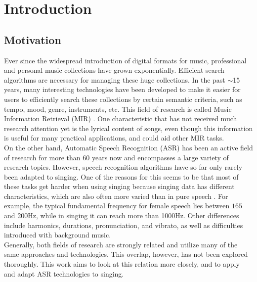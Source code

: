 \chapter{Introduction} \label{chap:introduction}
\section{Motivation}\label{sec:intro_motivation}

Ever since the widespread introduction of digital formats for music, professional and personal music collections have grown exponentially. Efficient search algorithms are necessary for managing these huge collections. In the past $\sim$15 years, many interesting technologies have been developed to make it easier for users to efficiently search these collections by certain semantic criteria, such as tempo, mood, genre, instruments, etc. This field of research is called Music Information Retrieval (MIR) \cite{incollection:mir}. One characteristic that has not received much research attention yet is the lyrical content of songs, even though this information is useful for many practical applications, and could aid other MIR tasks.\\

On the other hand, Automatic Speech Recognition (ASR) has been an active field of research for more than 60 years now \cite{juang_rabiner_history} and encompasses a large variety of research topics. However, speech recognition algorithms have so far only rarely been adapted to singing. One of the reasons for this seems to be that most of these tasks get harder when using singing because singing data has different characteristics, which are also often more varied than in pure speech \cite{loscos}. For example, the typical fundamental frequency for female speech lies between $165$ and 200Hz, while in singing it can reach more than 1000Hz. Other differences include harmonics, durations, pronunciation, and vibrato, as well as difficulties introduced with background music.\\

Generally, both fields of research are strongly related and utilize many of the same approaches and technologies. This overlap, however, has not been explored thoroughly. This work aims to look at this relation more closely, and to apply and adapt ASR technologies to singing.\\

